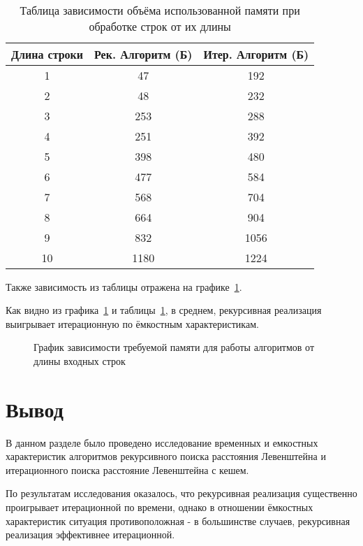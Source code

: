 \

\begin{longtable}{|c|c|c|}
\caption{Таблица зависимости объёма использованной памяти при обработке строк от их длины}
\label{tbl:mem_table}
\\
\hline
Длина строки & Рек. Алгоритм (Б) & Итер. Алгоритм (Б) \\ \hline
1	&	47		&	192 \\ \hline 
2	&	48		&	232 \\ \hline 
3	&	253		&	288 \\ \hline 
4	&	251		&	392 \\ \hline 
5	&	398		&	480 \\ \hline 
6	&	477		&	584 \\ \hline 
7	&	568		&	704 \\ \hline 
8	&	664		&	904 \\ \hline 
9	&	832		&	1056 \\ \hline 
10	&	1180	&	1224 \\ \hline 
\end{longtable}

Также зависимость из таблицы отражена на графике~\ref{fig:mem_graph}.

Как видно из графика~\ref{fig:mem_graph} и таблицы~\ref{tbl:mem_table}, в среднем, рекурсивная реализация выигрывает итерационную по ёмкостным характеристикам.

\begin{figure}[h]
	\centering
	
	\caption{График зависимости требуемой памяти для работы алгоритмов от длины входных строк}
	\label{fig:mem_graph}
\end{figure}

\pagebreak

\section{Вывод}

В данном разделе было проведено исследование временных и емкостных характеристик алгоритмов рекурсивного поиска расстояния Левенштейна и итерационного поиска расстояние Левенштейна с кешем.

По результатам исследования оказалось, что рекурсивная реализация существенно проигрывает итерационной по времени, однако в отношении ёмкостных характеристик ситуация противоположная - в большинстве случаев, рекурсивная реализация эффективнее итерационной.

\clearpage